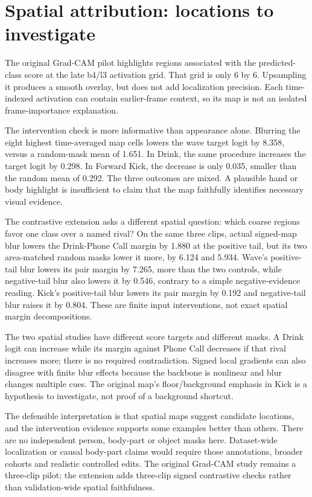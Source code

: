 \documentclass[11pt]{article}
\begin{document}
\section{Spatial attribution: locations to investigate}
The original Grad-CAM pilot highlights regions associated with the predicted-class score at the late b4/l3 activation grid. That grid is only 6 by 6. Upsampling it produces a smooth overlay, but does not add localization precision. Each time-indexed activation can contain earlier-frame context, so its map is not an isolated frame-importance explanation.

The intervention check is more informative than appearance alone. Blurring the eight highest time-averaged map cells lowers the wave target logit by 8.358, versus a random-mask mean of 1.651. In Drink, the same procedure increases the target logit by 0.298. In Forward Kick, the decrease is only 0.035, smaller than the random mean of 0.292. The three outcomes are mixed. A plausible hand or body highlight is insufficient to claim that the map faithfully identifies necessary visual evidence.

The contrastive extension asks a different spatial question: which coarse regions favor one class over a named rival? On the same three clips, actual signed-map blur lowers the Drink-Phone Call margin by 1.880 at the positive tail, but its two area-matched random masks lower it more, by 6.124 and 5.934. Wave's positive-tail blur lowers its pair margin by 7.265, more than the two controls, while negative-tail blur also lowers it by 0.546, contrary to a simple negative-evidence reading. Kick's positive-tail blur lowers its pair margin by 0.192 and negative-tail blur raises it by 0.804. These are finite input interventions, not exact spatial margin decompositions.

The two spatial studies have different score targets and different masks. A Drink logit can increase while its margin against Phone Call decreases if that rival increases more; there is no required contradiction. Signed local gradients can also disagree with finite blur effects because the backbone is nonlinear and blur changes multiple cues. The original map's floor/background emphasis in Kick is a hypothesis to investigate, not proof of a background shortcut.

The defensible interpretation is that spatial maps suggest candidate locations, and the intervention evidence supports some examples better than others. There are no independent person, body-part or object masks here. Dataset-wide localization or causal body-part claims would require those annotations, broader cohorts and realistic controlled edits. The original Grad-CAM study remains a three-clip pilot; the extension adds three-clip signed contrastive checks rather than validation-wide spatial faithfulness.
\end{document}
